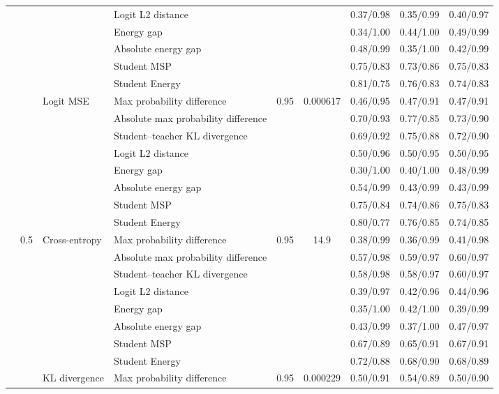 \documentclass[border=2pt]{standalone}
\begin{document}
\begin{tabular}{llllccccc}
 &  &  & Logit L2 distance &  &  & 0.37/0.98 & 0.35/0.99 & 0.40/0.97 \\
 &  &  & Energy gap &  &  & 0.34/1.00 & 0.44/1.00 & 0.49/0.99 \\
 &  &  & Absolute energy gap &  &  & 0.48/0.99 & 0.35/1.00 & 0.42/0.99 \\
 &  &  & Student MSP &  &  & 0.75/0.83 & 0.73/0.86 & 0.75/0.83 \\
 &  &  & Student Energy &  &  & 0.81/0.75 & 0.76/0.83 & 0.74/0.83 \\
\addlinespace
 &  & Logit MSE & Max probability difference & 0.95 & 0.000617 & 0.46/0.95 & 0.47/0.91 & 0.47/0.91 \\
 &  &  & Absolute max probability difference &  &  & 0.70/0.93 & 0.77/0.85 & 0.73/0.90 \\
 &  &  & Student--teacher KL divergence &  &  & 0.69/0.92 & 0.75/0.88 & 0.72/0.90 \\
 &  &  & Logit L2 distance &  &  & 0.50/0.96 & 0.50/0.95 & 0.50/0.95 \\
 &  &  & Energy gap &  &  & 0.30/1.00 & 0.40/1.00 & 0.48/0.99 \\
 &  &  & Absolute energy gap &  &  & 0.54/0.99 & 0.43/0.99 & 0.43/0.99 \\
 &  &  & Student MSP &  &  & 0.75/0.84 & 0.74/0.86 & 0.75/0.83 \\
 &  &  & Student Energy &  &  & 0.80/0.77 & 0.76/0.85 & 0.74/0.85 \\
\addlinespace
 & 0.5 & Cross-entropy & Max probability difference & 0.95 & 14.9 & 0.38/0.99 & 0.36/0.99 & 0.41/0.98 \\
 &  &  & Absolute max probability difference &  &  & 0.57/0.98 & 0.59/0.97 & 0.60/0.97 \\
 &  &  & Student--teacher KL divergence &  &  & 0.58/0.98 & 0.58/0.97 & 0.60/0.97 \\
 &  &  & Logit L2 distance &  &  & 0.39/0.97 & 0.42/0.96 & 0.44/0.96 \\
 &  &  & Energy gap &  &  & 0.35/1.00 & 0.42/1.00 & 0.39/0.99 \\
 &  &  & Absolute energy gap &  &  & 0.43/0.99 & 0.37/1.00 & 0.47/0.97 \\
 &  &  & Student MSP &  &  & 0.67/0.89 & 0.65/0.91 & 0.67/0.91 \\
 &  &  & Student Energy &  &  & 0.72/0.88 & 0.68/0.90 & 0.68/0.89 \\
\addlinespace
 &  & KL divergence & Max probability difference & 0.95 & 0.000229 & 0.50/0.91 & 0.54/0.89 & 0.50/0.90 \\

\end{tabular}
\end{document}
